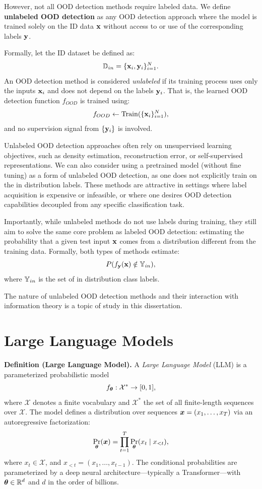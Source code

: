 \documentclass[11pt, oneside]{book}
\newcommand{\cX}{\mathcal{X}}
\theoremstyle{plain}
\theoremstyle{definition}
\theoremstyle{remark}
\begin{document}
However, not all OOD detection methods require labeled data. We define \textbf{unlabeled OOD detection} as any OOD detection approach where the model is trained solely on the ID data \( {\mathbf{x}} \) without access to or use of the corresponding labels \( {\mathbf{y}} \).

Formally, let the ID dataset be defined as:
\[
{\mathbb{D}}_{in} = \{ {\mathbf{x}}_i, {\mathbf{y}}_i \}_{i=1}^N.
\]
An OOD detection method is considered \emph{unlabeled} if its training process uses only the inputs \( {\mathbf{x}}_i \) and does not depend on the labels \( {\mathbf{y}}_i \). That is, the learned OOD detection function \( f_{OOD} \) is trained using:
\[
f_{OOD} \gets \mathrm{Train}(\{ {\mathbf{x}}_i \}_{i=1}^N),
\]
and no supervision signal from \( \{ {\mathbf{y}}_i \} \) is involved.

Unlabeled OOD detection approaches often rely on unsupervised learning objectives, such as density estimation, reconstruction error, or self-supervised representations. We can also consider using a pretrained model (without fine tuning) as a form of unlabeled OOD detection, as one does not explicitly train on the in distribution labels. These methods are attractive in settings where label acquisition is expensive or infeasible, or where one desires OOD detection capabilities decoupled from any specific classification task.

Importantly, while unlabeled methods do not use labels during training, they still aim to solve the same core problem as labeled OOD detection: estimating the probability that a given test input \( {\mathbf{x}} \) comes from a distribution different from the training data. Formally, both types of methods estimate:
\[
P(f_{\mathbf{y}}({\mathbf{x}}) \notin {\mathbb{Y}}_{in}),
\]
where \( {\mathbb{Y}}_{in} \) is the set of in distribution class labels. 

The nature of unlabeled OOD detection methods and their interaction with information theory is a topic of study in this dissertation.

\section{Large Language Models}


\textbf{Definition (Large Language Model).}
A \emph{Large Language Model} (LLM) is a parameterized probabilistic model 
\[
f_{\vtheta} : \cX^* \rightarrow [0,1],
\]
where $\cX$ denotes a finite vocabulary and $\cX^*$ the set of all finite-length sequences over $\cX$. The model defines a distribution over sequences ${\bm{x}} = (x_1, \dots, x_T)$ via an autoregressive factorization:
\[
\Pr_{{\bm{\theta}}}({\bm{x}}) = \prod_{t=1}^{T} \Pr_{{\bm{\theta}}}(x_t \mid x_{<t}),
\]
where $x_t \in \cX$, and $x_{<t} = (x_1, \dots, x_{t-1})$. The conditional probabilities are parameterized by a deep neural architecture—typically a Transformer—with ${\bm{\theta}} \in \mathbb{R}^d$ and $d$ in the order of billions.
\end{document}
